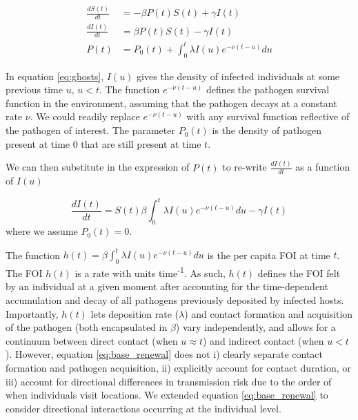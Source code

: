 \documentclass[11pt]{article}
\begin{document}
\begin{equation}
    \begin{aligned}
        \frac{d S(t)}{dt} &= - \beta P(t) S(t) + \gamma I(t) \\
        \frac{d I(t)}{dt} &= \beta P(t) S(t) - \gamma I(t) \\
        P(t) &= P_0(t) +  \int_{0}^{t} \lambda I(u) e^{-\nu(t - u)} du
     \end{aligned}
     \label{eq:ghosts}
\end{equation}

In equation \ref{eq:ghosts}, $I(u)$ gives the density of infected individuals at some previous time $u$, $u < t$. The function $e^{-\nu(t - u)}$ defines the pathogen survival function in the environment, assuming that the pathogen decays at a constant rate $\nu$. We could readily replace $e^{-\nu(t - u)}$ with any survival function reflective of the pathogen of interest. The parameter $P_0(t)$ is the density of pathogen present at time 0 that are still present at time $t$.

We can then substitute in the expression of $P(t)$ to re-write $\frac{d I(t)}{dt}$ as a function of $I(u)$

\begin{equation}
    \frac{d I(t)}{dt} = S(t) \beta \int_{0}^{t} \lambda I(u) e^{-\nu(t - u)} du  - \gamma I(t)
    \label{eq:base_renewal}
\end{equation}
where we assume $P_0(t) = 0$.

The function $h(t) = \beta \int_{0}^{t} \lambda I(u) e^{-\nu(t - u)} du$ is the per capita FOI at time $t$.  The FOI $h(t)$ is a rate with units time\textsuperscript{-1}. As such, $h(t)$ defines the FOI felt by an individual at a given moment after accounting for the time-dependent accumulation and decay of all pathogens previously deposited by infected hosts. Importantly, $h(t)$ lets deposition rate ($\lambda$) and contact formation and acquisition of the pathogen (both encapsulated in $\beta$) vary independently, and allows for a continuum between direct contact (when $u \approx t$) and indirect contact (when $u < t$).  However, equation \ref{eq:base_renewal} does not i) clearly separate contact formation and pathogen acquisition, ii) explicitly account for contact duration, or iii) account for directional differences in transmission risk due to the order of when individuals visit locations.  We extended equation \ref{eq:base_renewal} to consider directional interactions occurring at the individual level.
\end{document}
